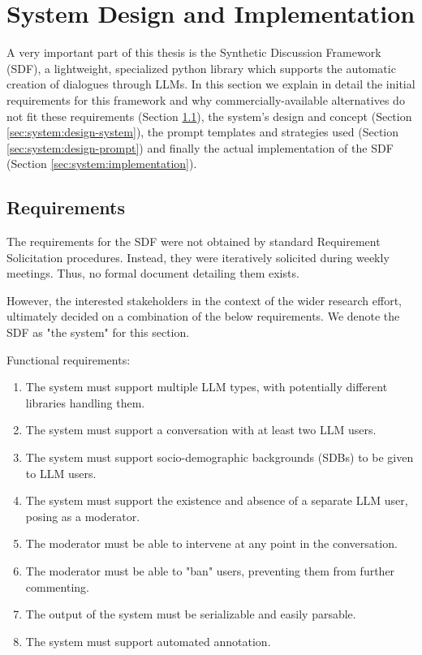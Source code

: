 %
\chapter{System Design and Implementation}
\label{sec:system}

A very important part of this thesis is the Synthetic Discussion Framework (SDF), a lightweight, specialized python library which supports the automatic creation of dialogues through LLMs. In this section we explain in detail the initial requirements for this framework and why commercially-available alternatives do not fit these requirements (Section \ref{sec:system:requirements}), the system's design and concept (Section \ref{sec:system:design-system}), the prompt templates and strategies used (Section \ref{sec:system:design-prompt}) and finally the actual implementation of the SDF (Section \ref{sec:system:implementation}).

\section{Requirements}
\label{sec:system:requirements}


The requirements for the SDF were not obtained by standard Requirement Solicitation procedures. Instead, they were iteratively solicited during weekly meetings. Thus, no formal document detailing them exists. 

However, the interested stakeholders in the context of the wider research effort, ultimately decided on a combination of the below requirements. We denote the SDF as "the system" for this section.

Functional requirements:
\begin{enumerate}
	\item The system must support multiple LLM types, with potentially different libraries handling them.
	\item The system must support a conversation with at least two LLM users.
	\item The system must support socio-demographic backgrounds (SDBs) to be given to LLM users.
	\item The system must support the existence and absence of a separate LLM user, posing as a moderator.
	\item The moderator must be able to intervene at any point in the conversation.
	\item The moderator must be able to "ban" users, preventing them from further commenting.
	\item The output of the system must be serializable and easily parsable.
	\item The system must support automated annotation.
\end{enumerate}


